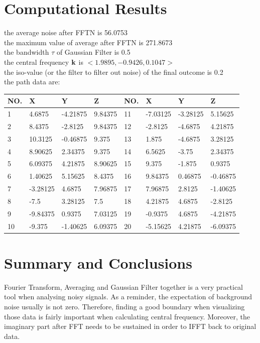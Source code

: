 \documentclass[12pt]{article}
\begin{document}
\section{Computational Results}
the average noise after FFTN is 56.0753\\
the maximum value of average after FFTN is 271.8673\\
the bandwidth $\tau$ of Gaussian Filter is 0.5\\
the central frequency $\bf k$ is $<1.9895, -0.9426, 0.1047>$ \\
the iso-value (or the filter to filter out noise) of the final outcome is 0.2\\
the path data are:
\begin{table}[H]
\begin{tabular}{|l|l|l|l|l|l|l|l|}
\hline
 NO. &X        & Y        & Z        & NO. &X        &Y         &Z  \\ \hline
1  &4.6875   & -4.21875 & 9.84375  &11 &-7.03125 & -3.28125 & 5.15625\\\hline
2  &8.4375   & -2.8125  & 9.84375  &12 &-2.8125  & -4.6875  & 4.21875\\\hline
3  &10.3125  & -0.46875 & 9.375    &13 &1.875    & -4.6875  & 3.28125\\\hline
4  &8.90625  & 2.34375  & 9.375    &14 &6.5625   & -3.75    & 2.34375\\ \hline
5  &6.09375  & 4.21875  & 8.90625  &15 &9.375    & -1.875   & 0.9375\\\hline
6  &1.40625  & 5.15625  & 8.4375   &16 &9.84375  & 0.46875  & -0.46875\\\hline
7  &-3.28125 & 4.6875   & 7.96875  &17 &7.96875  & 2.8125   & -1.40625\\\hline
8  &-7.5     & 3.28125  & 7.5      &18 &4.21875  & 4.6875   & -2.8125\\\hline
9  &-9.84375 & 0.9375   & 7.03125  &19 &-0.9375  & 4.6875   & -4.21875\\\hline
10 &-9.375   & -1.40625 & 6.09375  &20 &-5.15625 & 4.21875  & -6.09375\\\hline  
\end{tabular}
\end{table}
\section{Summary and Conclusions}
Fourier Transform, Averaging and Gaussian Filter together is a very practical tool when analysing noisy signals. As a reminder, the expectation of background noise usually is not zero. Therefore, finding a good boundary when visualizing those data is fairly important when calculating central frequency. Moreover, the imaginary part after FFT needs to be sustained in order to IFFT back to original data.
\end{document}
